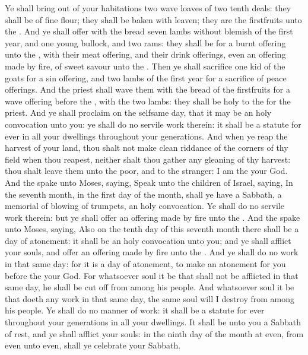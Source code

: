 \begin{biblechapter}
\verse Ye shall bring out of your habitations two wave loaves of two tenth deals: they shall be of fine flour; they shall be baken with leaven; they are the firstfruits unto the \LORD.
\verse And ye shall offer with the bread seven lambs without blemish of the first year, and one young bullock, and two rams: they shall be for a burnt offering unto the \LORD, with their meat offering, and their drink offerings, even an offering made by fire, of sweet savour unto the \LORD.
\verse Then ye shall sacrifice one kid of the goats for a sin offering, and two lambs of the first year for a sacrifice of peace offerings.
\verse And the priest shall wave them with the bread of the firstfruits for a wave offering before the \LORD, with the two lambs: they shall be holy to the \LORD for the priest.
\verse And ye shall proclaim on the selfsame day, that it may be an holy convocation unto you: ye shall do no servile work therein: it shall be a statute for ever in all your dwellings throughout your generations.
\verse And when ye reap the harvest of your land, thou shalt not make clean riddance of the corners of thy field when thou reapest, neither shalt thou gather any gleaning of thy harvest: thou shalt leave them unto the poor, and to the stranger: I am the \LORD your God.
 And the \LORD spake unto Moses, saying,
\verse Speak unto the children of Israel, saying, In the seventh month, in the first day of the month, shall ye have a Sabbath, a memorial of blowing of trumpets, an holy convocation.
\verse Ye shall do no servile work therein: but ye shall offer an offering made by fire unto the \LORD.
 And the \LORD spake unto Moses, saying,
\verse Also on the tenth day of this seventh month there shall be a day of atonement: it shall be an holy convocation unto you; and ye shall afflict your souls, and offer an offering made by fire unto the \LORD.
\verse And ye shall do no work in that same day: for it is a day of atonement, to make an atonement for you before the \LORD your God.
\verse For whatsoever soul it be that shall not be afflicted in that same day, he shall be cut off from among his people.
\verse And whatsoever soul it be that doeth any work in that same day, the same soul will I destroy from among his people.
\verse Ye shall do no manner of work: it shall be a statute for ever throughout your generations in all your dwellings.
\verse It shall be unto you a Sabbath of rest, and ye shall afflict your souls: in the ninth day of the month at even, from even unto even, shall ye celebrate your Sabbath.

\end{biblechapter}
